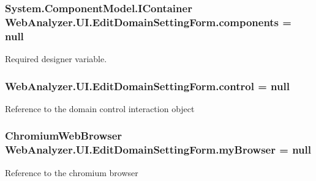 \subsubsection[{components}]{\setlength{\rightskip}{0pt plus 5cm}System.\+Component\+Model.\+I\+Container Web\+Analyzer.\+U\+I.\+Edit\+Domain\+Setting\+Form.\+components = null\hspace{0.3cm}{\ttfamily [private]}}\label{class_web_analyzer_1_1_u_i_1_1_edit_domain_setting_form_af2e698f2728b4d6bd25a12076c549be3}


Required designer variable. 

\hypertarget{class_web_analyzer_1_1_u_i_1_1_edit_domain_setting_form_a37601f0104b9dec1703687fa74d4c32d}{}
\subsubsection[{control}]{ Web\+Analyzer.\+U\+I.\+Edit\+Domain\+Setting\+Form.\+control = null\hspace{0.3cm}{\ttfamily [private]}}\label{class_web_analyzer_1_1_u_i_1_1_edit_domain_setting_form_a37601f0104b9dec1703687fa74d4c32d}


Reference to the domain control interaction object 

\hypertarget{class_web_analyzer_1_1_u_i_1_1_edit_domain_setting_form_abfd63dc104e7aeb07ba7aec98cc9356c}{}
\subsubsection[{my\+Browser}]{\setlength{\rightskip}{0pt plus 5cm}Chromium\+Web\+Browser Web\+Analyzer.\+U\+I.\+Edit\+Domain\+Setting\+Form.\+my\+Browser = null\hspace{0.3cm}{\ttfamily [private]}}\label{class_web_analyzer_1_1_u_i_1_1_edit_domain_setting_form_abfd63dc104e7aeb07ba7aec98cc9356c}


Reference to the chromium browser 



